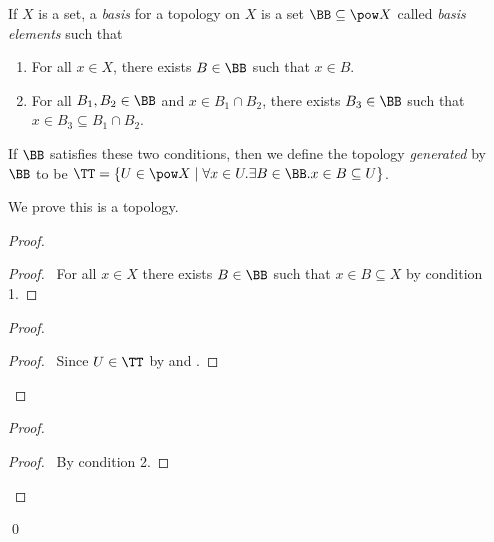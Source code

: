 \begin{definition}[Basis]
    If $X$ is a set, a \emph{basis} for a topology on $X$ is a set $\BB \subseteq \pow X$ called \emph{basis elements} such that
    \begin{enumerate}
        \item For all $x \in X$, there exists $B \in \BB$ such that $x \in B$.
        \item For all $B_1, B_2 \in \BB$ and $x \in B_1 \cap B_2$, there exists $B_3 \in \BB$ such that
        $x \in B_3 \subseteq B_1 \cap B_2$.
    \end{enumerate}

    If $\BB$ satisfies these two conditions, then we define the topology \emph{generated} by $\BB$ to be
    $\TT = \{ U \in \pow X \mid \forall x \in U. \exists B \in \BB. x \in B \subseteq U \}$.
\end{definition}

We prove this is a topology.

\begin{proof}
    \pf
    \begin{proof}
        \pf\ For all $x \in X$ there exists $B \in \BB$ such that $x \in B \subseteq X$ by condition 1.
    \end{proof}
    \begin{proof}
        \begin{proof}
            \pf\ Since $U \in \TT$ by  and .
        \end{proof}
    \end{proof}
    \begin{proof}
        \begin{proof}
            \pf\ By condition 2.
        \end{proof}
    \end{proof}
    \qed
\end{proof}

